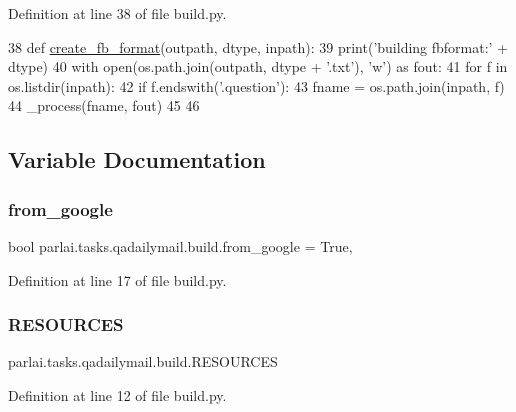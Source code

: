 Definition at line 38 of file build.\+py.


\begin{DoxyCode}
38 \textcolor{keyword}{def }\hyperlink{namespaceparlai_1_1tasks_1_1wikiqa_1_1build_a554828702769592403db58c955d1dfe3}{create\_fb\_format}(outpath, dtype, inpath):
39     print(\textcolor{stringliteral}{'building fbformat:'} + dtype)
40     with open(os.path.join(outpath, dtype + \textcolor{stringliteral}{'.txt'}), \textcolor{stringliteral}{'w'}) \textcolor{keyword}{as} fout:
41         \textcolor{keywordflow}{for} f \textcolor{keywordflow}{in} os.listdir(inpath):
42             \textcolor{keywordflow}{if} f.endswith(\textcolor{stringliteral}{'.question'}):
43                 fname = os.path.join(inpath, f)
44                 \_process(fname, fout)
45 
46 
\end{DoxyCode}


\subsection{Variable Documentation}
\mbox{\label{namespaceparlai_1_1tasks_1_1qadailymail_1_1build_a86e0e34719bc9ae432fc5ef70ae2ca80}} 
\subsubsection{\texorpdfstring{from\+\_\+google}{from\_google}}
{\footnotesize\ttfamily bool parlai.\+tasks.\+qadailymail.\+build.\+from\+\_\+google = True,}



Definition at line 17 of file build.\+py.

\mbox{\label{namespaceparlai_1_1tasks_1_1qadailymail_1_1build_a02ef3b1091c6cd3ab59d22b37d31ebf9}} 
\subsubsection{\texorpdfstring{R\+E\+S\+O\+U\+R\+C\+ES}{RESOURCES}}
{\footnotesize\ttfamily parlai.\+tasks.\+qadailymail.\+build.\+R\+E\+S\+O\+U\+R\+C\+ES}



Definition at line 12 of file build.\+py.

